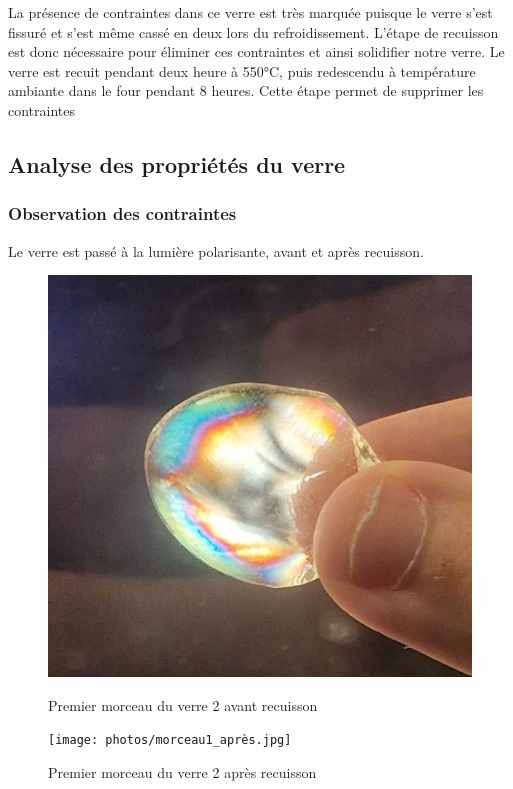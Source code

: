 \documentclass{article}
\begin{document}
La présence de contraintes dans ce verre est très marquée puisque le verre s'est fissuré et s'est même cassé en deux lors du refroidissement. L'étape de recuisson est donc nécessaire pour éliminer ces contraintes et ainsi solidifier notre verre.
Le verre est recuit pendant deux heure à 550°C, puis redescendu à température ambiante dans le four pendant 8 heures. Cette étape permet de supprimer les contraintes

\subsection{Analyse des propriétés du verre}

\subsubsection{Observation des contraintes}

Le verre est passé à la lumière polarisante, avant et après recuisson.

\begin{figure}[h]
    \centering
    \begin{minipage}{0.3\textwidth}
        \centering
        \includegraphics[width=\textwidth]{photos/morceau1_avant.jpg}
        \caption{Premier morceau du verre 2 avant recuisson}
    \end{minipage}
    \hspace{0.5cm}
    \begin{minipage}{0.3\textwidth}
        \centering
        \texttt{[image: photos/morceau1\_après.jpg]}
        \caption{Premier morceau du verre 2 après recuisson}
    \end{minipage}
\end{figure}
\end{document}
